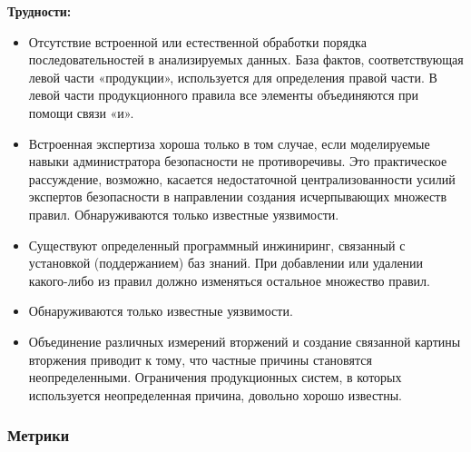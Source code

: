 \textbf{Трудности:}
\begin{itemize}
    \item Отсутствие встроенной или естественной обработки порядка последовательностей в анализируемых 
    данных. База фактов, соответствующая левой части «продукции», используется для определения правой 
    части. В левой части продукционного правила все элементы объединяются при помощи связи «и».
    \item Встроенная экспертиза хороша только в том случае, если моделируемые навыки администратора 
    безопасности не противоречивы. Это практическое рассуждение, возможно, касается 
    недостаточной централизованности усилий экспертов безопасности в направлении создания 
    исчерпывающих множеств правил. Обнаруживаются только известные уязвимости.
    \item Существуют определенный программный инжиниринг, связанный с установкой (поддержанием) баз знаний. 
    При добавлении или удалении какого-либо из правил должно изменяться остальное множество правил.
    \item Обнаруживаются только известные уязвимости.
    \item Объединение различных измерений вторжений и создание связанной картины вторжения приводит к 
    тому, что частные причины становятся неопределенными. Ограничения продукционных систем, в 
    которых используется неопределенная причина, довольно хорошо известны.
\end{itemize}
\autocite{BeynonDavies}



\subsubsection{Метрики}

